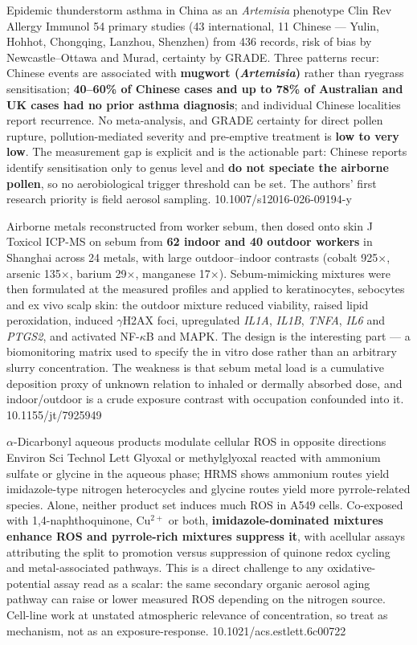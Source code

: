 \documentclass[10pt]{article}
\begin{document}
{Epidemic thunderstorm asthma in China as an \textit{Artemisia} phenotype}
{Clin Rev Allergy Immunol}
{54 primary studies (43 international, 11 Chinese --- Yulin, Hohhot, Chongqing, Lanzhou,
Shenzhen) from 436 records, risk of bias by Newcastle--Ottawa and Murad, certainty by
GRADE. Three patterns recur: Chinese events are associated with \textbf{mugwort
(\textit{Artemisia})} rather than ryegrass sensitisation; \textbf{40--60\% of Chinese
cases and up to 78\% of Australian and UK cases had no prior asthma diagnosis}; and
individual Chinese localities report recurrence. No meta-analysis, and GRADE certainty for
direct pollen rupture, pollution-mediated severity and pre-emptive treatment is
\textbf{low to very low}. The measurement gap is explicit and is the actionable part:
Chinese reports identify sensitisation only to genus level and \textbf{do not speciate the
airborne pollen}, so no aerobiological trigger threshold can be set. The authors' first
research priority is field aerosol sampling.}
{10.1007/s12016-026-09194-y}


{Airborne metals reconstructed from worker sebum, then dosed onto skin}
{J Toxicol}
{ICP-MS on sebum from \textbf{62 indoor and 40 outdoor workers} in Shanghai across 24
metals, with large outdoor--indoor contrasts (cobalt 925$\times$, arsenic 135$\times$,
barium 29$\times$, manganese 17$\times$). Sebum-mimicking mixtures were then formulated at
the measured profiles and applied to keratinocytes, sebocytes and ex vivo scalp skin: the
outdoor mixture reduced viability, raised lipid peroxidation, induced $\gamma$H2AX foci,
upregulated \textit{IL1A}, \textit{IL1B}, \textit{TNFA}, \textit{IL6} and \textit{PTGS2},
and activated NF-$\kappa$B and MAPK. The design is the interesting part --- a biomonitoring
matrix used to specify the in vitro dose rather than an arbitrary slurry concentration.
The weakness is that sebum metal load is a cumulative deposition proxy of unknown
relation to inhaled or dermally absorbed dose, and indoor/outdoor is a crude exposure
contrast with occupation confounded into it.}
{10.1155/jt/7925949}

{$\alpha$-Dicarbonyl aqueous products modulate cellular ROS in opposite directions}
{Environ Sci Technol Lett}
{Glyoxal or methylglyoxal reacted with ammonium sulfate or glycine in the aqueous phase;
HRMS shows ammonium routes yield imidazole-type nitrogen heterocycles and glycine routes
yield more pyrrole-related species. Alone, neither product set induces much ROS in A549
cells. Co-exposed with 1,4-naphthoquinone, Cu$^{2+}$ or both, \textbf{imidazole-dominated
mixtures enhance ROS and pyrrole-rich mixtures suppress it}, with acellular assays
attributing the split to promotion versus suppression of quinone redox cycling and
metal-associated pathways. This is a direct challenge to any oxidative-potential assay
read as a scalar: the same secondary organic aerosol aging pathway can raise or lower
measured ROS depending on the nitrogen source. Cell-line work at unstated
atmospheric relevance of concentration, so treat as mechanism, not as an exposure-response.}
{10.1021/acs.estlett.6c00722}
\end{document}
